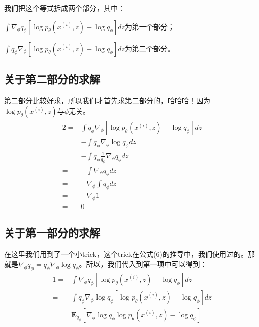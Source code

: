 \documentclass[a4paper]{article}
\begin{document}
我们把这个等式拆成两个部分，其中：

$\int \nabla_{\phi} q_{\phi}\left[ \log p_{\theta}(x^{(i)},z) - \log q_{\phi} \right]dz$为第一个部分；

$ \int q_{\phi}\nabla_{\phi} \left[ \log p_{\theta}(x^{(i)},z) - \log q_{\phi} \right]dz$为第二个部分。

\subsection{关于第二部分的求解}
第二部分比较好求，所以我们才首先求第二部分的，哈哈哈！因为$\log p_{\theta}(x^{(i)},z)$与$\phi$无关。
\begin{equation}
    \begin{split}
        2 
        = & \int q_{\phi}\nabla_{\phi} \left[ \log p_{\theta}(x^{(i)},z) - \log q_{\phi} \right]dz \\
        = & -\int q_{\phi}\nabla_{\phi}\log q_{\phi} dz \\
        = & -\int q_{\phi} \frac{1}{q_{\phi}}\nabla_{\phi} q_{\phi} dz \\
        = & -\int \nabla_{\phi} q_{\phi} dz \\
        = & - \nabla_{\phi} \int q_{\phi} dz \\
        = & - \nabla_{\phi} 1 \\
        = & 0
    \end{split}
\end{equation}

\subsection{关于第一部分的求解}
在这里我们用到了一个小trick，这个trick在公式(6)的推导中，我们使用过的。那就是$\nabla_{\phi} q_{\phi} = q_{\phi}\nabla_{\phi}\log q_{\phi} $。所以，我们代入到第一项中可以得到：
\begin{equation}
    \begin{split}
        1 
        = & \int \nabla_{\phi} q_{\phi}\left[ \log p_{\theta}(x^{(i)},z) - \log q_{\phi} \right]dz \\
        = & \int q_{\phi}\nabla_{\phi}\log q_{\phi} \left[ \log p_{\theta}(x^{(i)},z) - \log q_{\phi} \right]dz \\
        = & \mathbf{E}_{q_{\phi}} \left[ \nabla_{\phi}\log q_{\phi} \log p_{\theta}(x^{(i)},z) - \log q_{\phi} \right] 
    \end{split}
\end{equation}
\end{document}
